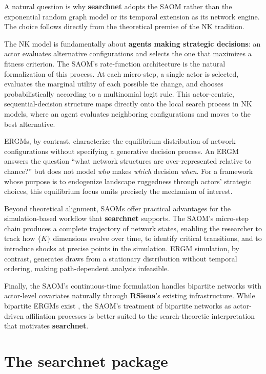 \documentclass[
]{article}
\begin{document}
A natural question is why \textbf{searchnet} adopts the SAOM rather than
the exponential random graph model
\citep[ERGM;][]{LusherKoskinenRobins2013} or its temporal extension
\citep[TERGM;][]{Hanneke2010} as its network engine. The choice follows
directly from the theoretical premise of the NK tradition.

The NK model is fundamentally about \textbf{agents making strategic
decisions}: an actor evaluates alternative configurations and selects
the one that maximizes a fitness criterion. The SAOM's rate-function
architecture is the natural formalization of this process. At each
micro-step, a single actor is selected, evaluates the marginal utility
of each possible tie change, and chooses probabilistically according to
a multinomial logit rule. This actor-centric, sequential-decision
structure maps directly onto the local search process in NK models,
where an agent evaluates neighboring configurations and moves to the
best alternative.

ERGMs, by contrast, characterize the equilibrium distribution of network
configurations without specifying a generative decision process. An ERGM
answers the question ``what network structures are over-represented
relative to chance?'' but does not model \emph{who} makes \emph{which}
decision \emph{when}. For a framework whose purpose is to endogenize
landscape ruggedness through actors' strategic choices, this equilibrium
focus omits precisely the mechanism of interest.

Beyond theoretical alignment, SAOMs offer practical advantages for the
simulation-based workflow that \textbf{searchnet} supports. The SAOM's
micro-step chain produces a complete trajectory of network states,
enabling the researcher to track how \(\{K\}\) dimensions evolve over
time, to identify critical transitions, and to introduce shocks at
precise points in the simulation. ERGM simulation, by contrast,
generates draws from a stationary distribution without temporal
ordering, making path-dependent analysis infeasible.

Finally, the SAOM's continuous-time formulation handles bipartite
networks with actor-level covariates naturally through \textbf{RSiena}'s
existing infrastructure. While bipartite ERGMs exist
\citep{WangPattison2009}, the SAOM's treatment of bipartite networks as
actor-driven affiliation processes is better suited to the
search-theoretic interpretation that motivates \textbf{searchnet}.

\section{\texorpdfstring{The \textbf{searchnet}
package}{The  package}}\label{sec:package}
\end{document}
